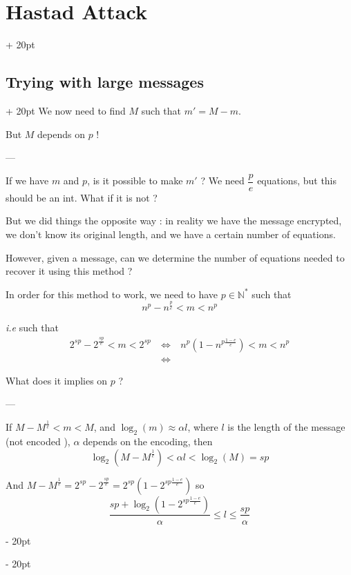 \documentclass[a4paper, 12pt, twoside]{article}
\newcommand{\N}{\mathbb{N}} %
\newcommand{\lr}[1]{\left( #1 \right)}
\newcommand{\floor}[1]{\left\lfloor #1 \right\rfloor}
\newcommand{\ssi}{\ \Leftrightarrow \ }
\renewcommand{\le}{\leqslant}
\newcommand{\ind}[1][20pt]{\advance\leftskip + #1}
\newcommand{\deind}[1][20pt]{\advance\leftskip - #1}
\newenvironment{indt}[2][20pt]{#2 \par \ind[#1]}{\par \deind} %
\begin{document}
\begin{indt}{\section{Hastad Attack}}
\begin{indt}{\subsection{Trying with large messages}}
            We now need to find $M$ such that $m' = M - m$.
            
            But $M$ depends on $p$ !
            
            ---
            
            If we have $m$ and $p$, is it possible to make $m'$ ? We need $\dfrac p e$ equations, but this should be an int. What if it is not ?
            
            
            \vspace{6pt}
            
            But we did things the opposite way : in reality we have the message encrypted, we don't know its original length, and we have a certain number of equations.
            
            However, given a message, can we determine the number of equations needed to recover it using this method ?
            
            In order for this method to work, we need to have $p \in \N^*$ such that
            \[
                n^p - n^{\tfrac p e} < m < n^p
            \]
            
            \textit{i.e} such that
            \[
                \begin{array}{rcl}
                    2^{sp} - 2^{\tfrac{sp}{e}} < m < 2^{sp}
                    &\ssi&
                    n^p \lr{1 - n^{p\tfrac{1 - e}{e}}} < m < n^p
                    \\
                    &\ssi&
                \end{array}
            \]
            
            What does it implies on $p$ ?
            
            ---
            
            If $M - M^{\tfrac 1 e} < m < M$, and
            $\log_2(m) \approx \alpha l$, where $l$ is the length of the message (not encoded
            ), $\alpha$ depends on the encoding, then
            \[
                \log_2\!\lr{M - M^{\tfrac 1 e}} < \alpha l < \log_2(M) = sp
            \]
            
            And $M - M^{\tfrac 1 e} = 2^{sp} - 2^{\tfrac {sp} e} = 2^{sp}\lr{1 - 2^{sp\tfrac{1 - e}{e}}}$ so
            \[
                \dfrac{sp + \log_2\!\lr{1 - 2^{sp\tfrac{1 - e}{e}}}}{\alpha} \le l \le \dfrac{sp}{\alpha}
            \]
            

\end{indt}
\end{indt}
\end{document}
